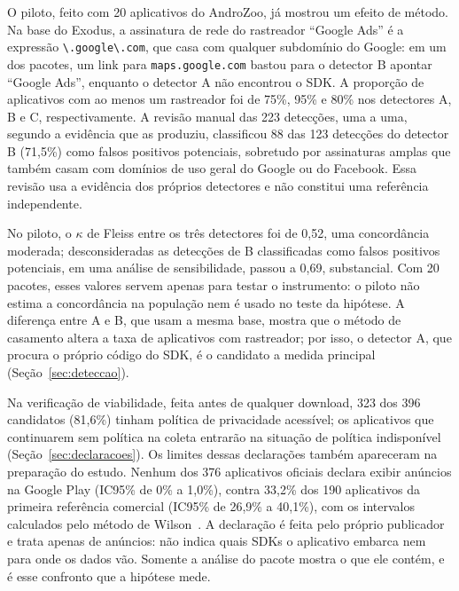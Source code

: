 \label{sec:res-piloto}

O piloto, feito com 20 aplicativos do AndroZoo, já mostrou um efeito de método. Na base do Exodus, a assinatura de rede do rastreador ``Google Ads'' é a expressão \texttt{\textbackslash{}.\allowbreak{}google\textbackslash{}.\allowbreak{}com}, que casa com qualquer subdomínio do Google: em um dos pacotes, um link para \texttt{maps.\allowbreak{}google.\allowbreak{}com} bastou para o detector B apontar ``Google Ads'', enquanto o detector A não encontrou o SDK. A proporção de aplicativos com ao menos um rastreador foi de 75\%, 95\% e 80\% nos detectores A, B e C, respectivamente. A revisão manual das 223 detecções, uma a uma, segundo a evidência que as produziu, classificou 88 das 123 detecções do detector B (71,5\%) como falsos positivos potenciais, sobretudo por assinaturas amplas que também casam com domínios de uso geral do Google ou do Facebook. Essa revisão usa a evidência dos próprios detectores e não constitui uma referência independente.

No piloto, o $\kappa$ de Fleiss entre os três detectores foi de 0,52, uma concordância moderada; desconsideradas as detecções de B classificadas como falsos positivos potenciais, em uma análise de sensibilidade, passou a 0,69, substancial. Com 20 pacotes, esses valores servem apenas para testar o instrumento: o piloto não estima a concordância na população nem é usado no teste da hipótese. A diferença entre A e B, que usam a mesma base, mostra que o método de casamento altera a taxa de aplicativos com rastreador; por isso, o detector A, que procura o próprio código do SDK, é o candidato a medida principal (Seção~\ref{sec:deteccao}).

\label{sec:res-declaracoes}

Na verificação de viabilidade, feita antes de qualquer download, 323 dos 396 candidatos (81,6\%) tinham política de privacidade acessível; os aplicativos que continuarem sem política na coleta entrarão na situação de política indisponível (Seção~\ref{sec:declaracoes}). Os limites dessas declarações também apareceram na preparação do estudo. Nenhum dos 376 aplicativos oficiais declara exibir anúncios na Google Play (IC95\% de 0\% a 1,0\%), contra 33,2\% dos 190 aplicativos da primeira referência comercial (IC95\% de 26,9\% a 40,1\%), com os intervalos calculados pelo método de Wilson~\cite{wilson1927}. A declaração é feita pelo próprio publicador e trata apenas de anúncios: não indica quais SDKs o aplicativo embarca nem para onde os dados vão. Somente a análise do pacote mostra o que ele contém, e é esse confronto que a hipótese mede.

